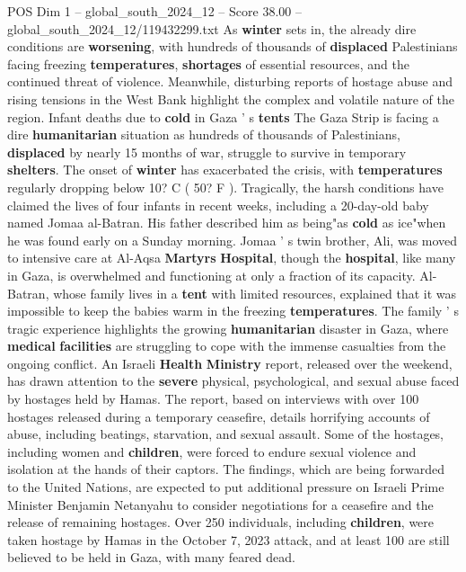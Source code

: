 \begin{textsample}{POS Dim 1 – global\_south\_2024\_12 – Score 38.00 – global\_south\_2024\_12/119432299.txt}  \label{ex:f1_pos_101}
As \textbf{winter} sets in, the already dire conditions are \textbf{worsening}, with hundreds of thousands of \textbf{displaced} Palestinians facing freezing \textbf{temperatures}, \textbf{shortages} of essential resources, and the continued threat of violence.
Meanwhile, disturbing reports of hostage abuse and rising tensions in the West Bank highlight the complex and volatile nature of the region.
Infant deaths due to \textbf{cold} in Gaza ' s \textbf{tents} The Gaza Strip is facing a dire \textbf{humanitarian} situation as hundreds of thousands of Palestinians, \textbf{displaced} by nearly 15 months of war, struggle to survive in temporary \textbf{shelters}.
The onset of \textbf{winter} has exacerbated the crisis, with \textbf{temperatures} regularly dropping below 10?
C ( 50?
F ).
Tragically, the harsh conditions have claimed the lives of four infants in recent weeks, including a 20-day-old baby named Jomaa al-Batran.
His father described him as being"as \textbf{cold} as ice"when he was found early on a Sunday morning.
Jomaa ' s twin brother, Ali, was moved to intensive care at Al-Aqsa \textbf{Martyrs} \textbf{Hospital}, though the \textbf{hospital}, like many in Gaza, is overwhelmed and functioning at only a fraction of its capacity.
Al-Batran, whose family lives in a \textbf{tent} with limited resources, explained that it was impossible to keep the babies warm in the freezing \textbf{temperatures}.
The family ' s tragic experience highlights the growing \textbf{humanitarian} disaster in Gaza, where \textbf{medical} \textbf{facilities} are struggling to cope with the immense casualties from the ongoing conflict.
An Israeli \textbf{Health} \textbf{Ministry} report, released over the weekend, has drawn attention to the \textbf{severe} physical, psychological, and sexual abuse faced by hostages held by Hamas.
The report, based on interviews with over 100 hostages released during a temporary ceasefire, details horrifying accounts of abuse, including beatings, starvation, and sexual assault.
Some of the hostages, including women and \textbf{children}, were forced to endure sexual violence and isolation at the hands of their captors.
The findings, which are being forwarded to the United Nations, are expected to put additional pressure on Israeli Prime Minister Benjamin Netanyahu to consider negotiations for a ceasefire and the release of remaining hostages.
Over 250 individuals, including \textbf{children}, were taken hostage by Hamas in the October 7, 2023 attack, and at least 100 are still believed to be held in Gaza, with many feared dead.

\end{textsample}

